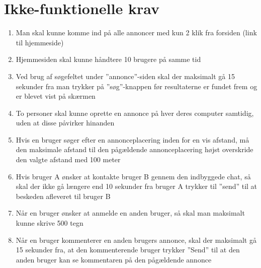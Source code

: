 \chapter{Ikke-funktionelle krav}

\begin{enumerate}
	\item Man skal kunne komme ind på alle annoncer med kun 2 klik fra forsiden (link til hjemmeside)
	
	\item Hjemmesiden skal kunne håndtere 10 brugere på samme tid
	
	\item Ved brug af søgefeltet under ''annonce''-siden skal der maksimalt gå 15 sekunder fra man trykker på ''søg''-knappen før resultaterne er fundet frem og er blevet vist på skærmen
	
	\item To personer skal kunne oprette en annonce på hver deres computer samtidig, uden at disse påvirker hinanden
	
	\item Hvis en bruger søger efter en annonceplacering inden for en vis afstand, må den maksimale afstand til den pågældende annonceplacering højst overskride den valgte afstand med 100 meter
	
	\item Hvis bruger A ønsker at kontakte bruger B gennem den indbyggede chat, så skal der ikke gå længere end 10 sekunder fra bruger A trykker til ''send'' til at beskeden afleveret til bruger B
	
	\item Når en bruger ønsker at anmelde en anden bruger, så skal man maksimalt kunne skrive 500 tegn
	
	\item Når en bruger kommenterer en anden brugers annonce, skal der maksimalt gå 15 sekunder fra, at den kommenterende bruger trykker ''Send'' til at den anden bruger kan se kommentaren på den pågældende annonce
	
\end{enumerate}